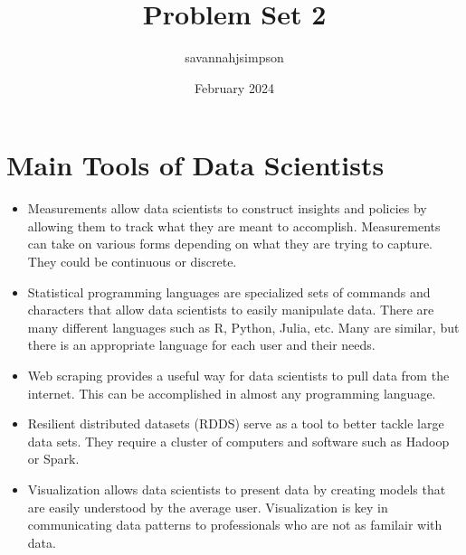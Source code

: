 \documentclass{article}
\title{Problem Set 2}
\author{savannahjsimpson }
\date{February 2024}
\begin{document}
\maketitle

\section{Main Tools of Data Scientists}
\begin{itemize}
  \item Measurements allow data scientists to construct insights and policies by allowing them to track what they are meant to accomplish. Measurements can take on various forms depending on what they are trying to capture. They could be continuous or discrete. 
  \item Statistical programming languages are specialized sets of commands and characters that allow data scientists to easily manipulate data. There are many different languages such as R, Python, Julia, etc. Many are similar, but there is an appropriate language for each user and their needs. 
  \item Web scraping provides a useful way for data scientists to pull data from the internet. This can be accomplished in almost any programming language. 
  \item Resilient distributed datasets (RDDS) serve as a tool to better tackle large data sets. They require a cluster of computers and software such as Hadoop or Spark. 
  \item Visualization allows data scientists to present data by creating models that are easily understood by the average user. Visualization is key in communicating data patterns to professionals who are not as familair with data. 
  \end{itemize}
\end{document}
